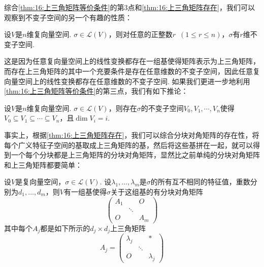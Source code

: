 综合\autoref{thm:16:上三角矩阵等价条件}的第3点和\autoref{thm:16:上三角矩阵存在}，我们可以观察到不变子空间的另一个有趣的性质：
\begin{corollary}
    设$V$是$n$维复向量空间. $\sigma\in \mathcal{L}(V)$，则对任意的正整数$r\enspace(1\leqslant r\leqslant n)$，$\sigma$有$r$维不变子空间.
\end{corollary}
这是因为任意复向量空间上的线性变换都存在一组基使得矩阵表示为上三角矩阵，而存在上三角矩阵的其中一个充要条件是存在任意维数的不变子空间，因此任意复向量空间上的线性变换都存在任意维数的不变子空间. 如果我们更进一步地利用\autoref{thm:16:上三角矩阵等价条件}的第三点，我们有如下推论：
\begin{corollary}
    设$V$是$n$维复向量空间. $\sigma\in \mathcal{L}(V)$，则存在$\sigma$的不变子空间$V_0,V_1,\cdots,V_n$使得$V_0\subseteq V_1\subseteq\cdots\subseteq V_n$，且$\dim V_i=i$.
\end{corollary}

事实上，根据\autoref{thm:16:上三角矩阵存在}，我们可以综合分块对角矩阵的存在性，将每个广义特征子空间的基取成上三角矩阵的基，然后将这些基拼在一起，就可以得到一个每个分块都是上三角矩阵的分块对角矩阵，显然比之前单纯的分块对角矩阵和上三角矩阵都要简单：
\begin{theorem} \label{thm:16:分块对角矩阵}
    设$V$是复向量空间，$\sigma\in \mathcal{L}(V)$. 设$\lambda_1,\ldots,\lambda_m$是$\sigma$的所有互不相同的特征值，重数分别为$d_1,\ldots,d_m$，则$V$有一组基使得$\sigma$关于这组基的有分块对角矩阵
    \[\begin{pmatrix}
            A_1 &  & O \\  & \ddots &  \\ O &  & A_m
        \end{pmatrix}\]
    其中每个$A_j$都是如下所示的$d_j\times d_j$上三角矩阵
    \[A_j=\begin{pmatrix}
            \lambda_j &  & * \\  & \ddots &  \\ O &  & \lambda_j
        \end{pmatrix}\]
\end{theorem}

